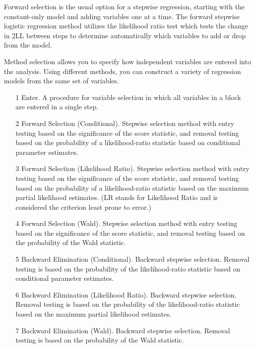 \documentclass[a4paper,12pt]{article}
\begin{document}
Forward selection is the usual option for a stepwise regression,
starting with the constant-only model and adding variables one at a time. The forward
stepwise logistic regression method utilizes the likelihood ratio test which tests the change in 2LL between steps to determine automatically which variables to add or drop from the model.

Method selection allows you to specify how independent variables are entered into the analysis.
Using different methods, you can construct a variety of regression models from the same set of
variables.

\begin{itemize}
	\item[1] Enter. A procedure for variable selection in which all variables in a block are entered in a
	single step.
	\item[2] Forward Selection (Conditional). Stepwise selection method with entry testing based on
	the significance of the score statistic, and removal testing based on the probability of a
	likelihood-ratio statistic based on conditional parameter estimates.
	\item[3] Forward Selection (Likelihood Ratio). Stepwise selection method with entry testing based
	on the significance of the score statistic, and removal testing based on the probability of a
	likelihood-ratio statistic based on the maximum partial likelihood estimates.  (LR stands for Likelihood Ratio and  is considered the criterion least prone to error.)
	\item[4] Forward Selection (Wald). Stepwise selection method with entry testing based on the
	significance of the score statistic, and removal testing based on the probability of the Wald
	statistic.
	\item[5] Backward Elimination (Conditional). Backward stepwise selection. Removal testing is based on
	the probability of the likelihood-ratio statistic based on conditional parameter estimates.
	\item[6] Backward Elimination (Likelihood Ratio). Backward stepwise selection. Removal testing
	is based on the probability of the likelihood-ratio statistic based on the maximum partial
	likelihood estimates.
	\item[7] Backward Elimination (Wald). Backward stepwise selection. Removal testing is based on the
	probability of the Wald statistic.
\end{itemize} 
\end{document}
